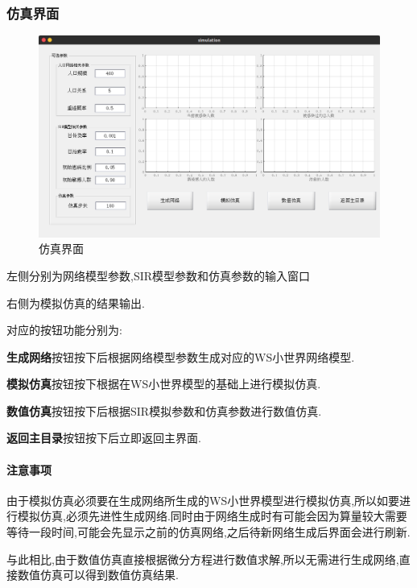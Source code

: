 \documentclass[supercite]{HustGraduPaper}
\begin{document}
	\subsubsection{仿真界面}
	\begin{figure}[H]
		\centering
		\includegraphics[scale=0.3]{Figures/simu.png}
		\caption{仿真界面}
	\end{figure} 
	左侧分别为网络模型参数,SIR模型参数和仿真参数的输入窗口 \par
	右侧为模拟仿真的结果输出. \par
	对应的按钮功能分别为: \par
	\textbf{生成网络}按钮按下后根据网络模型参数生成对应的WS小世界网络模型.\par
	\textbf{模拟仿真}按钮按下根据在WS小世界模型的基础上进行模拟仿真.\par
	\textbf{数值仿真}按钮按下后根据SIR模拟参数和仿真参数进行数值仿真.\par
	\textbf{返回主目录}按钮按下后立即返回主界面.\par

	\paragraph{注意事项}由于模拟仿真必须要在生成网络所生成的WS小世界模型进行模拟仿真,所以如要进行模拟仿真,必须先进性生成网络.同时由于网络生成时有可能会因为算量较大需要等待一段时间,可能会先显示之前的仿真网络,之后待新网络生成后界面会进行刷新.\par
	与此相比,由于数值仿真直接根据微分方程进行数值求解,所以无需进行生成网络,直接数值仿真可以得到数值仿真结果.
\end{document}
